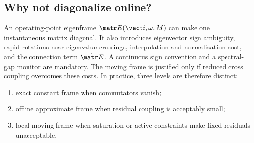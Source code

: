 \subsection{Why not diagonalize online?}

An operating-point eigenframe \(\matr E(\vect i,\omega,M)\) can make one
instantaneous matrix diagonal. It also introduces eigenvector sign ambiguity,
rapid rotations near eigenvalue crossings, interpolation and normalization
cost, and the connection term \(\dot{\matr E}\). A continuous sign convention
and a spectral-gap monitor are mandatory. The moving frame is justified only
if reduced cross coupling overcomes these costs. In practice, three levels are
therefore distinct:
\begin{enumerate}
 \item exact constant frame when commutators vanish;
 \item offline approximate frame when residual coupling is acceptably small;
 \item local moving frame when saturation or active constraints make fixed
       residuals unacceptable.
\end{enumerate}
